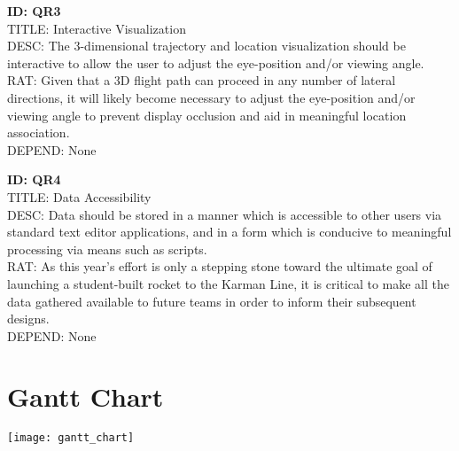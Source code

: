 \documentclass[onecolumn, draftclsnofoot,10pt, compsoc]{IEEEtran}
\begin{document}
			\noindent
			\textbf{ID: QR3}\\
			TITLE: Interactive Visualization\\
			DESC: The 3-dimensional trajectory and location visualization should be interactive to allow the user to adjust the eye-position and/or viewing angle.\\
			RAT: Given that a 3D flight path can proceed in any number of lateral directions, it will likely become necessary to adjust the eye-position and/or viewing angle to prevent display occlusion and aid in meaningful location association.\\
			DEPEND: None
			
			\noindent
			\textbf{ID: QR4}\\
			TITLE: Data Accessibility\\
			DESC: Data should be stored in a manner which is accessible to other users via standard text editor applications, and in a form which is conducive to meaningful processing via means such as scripts.\\
			RAT: As this year's effort is only a stepping stone toward the ultimate goal of launching a student-built rocket to the Karman Line, it is critical to make all the data gathered available to future teams in order to inform their subsequent designs.\\
			DEPEND: None


	\section{Gantt Chart}
		\texttt{[image: gantt\_chart]}
\end{document}
